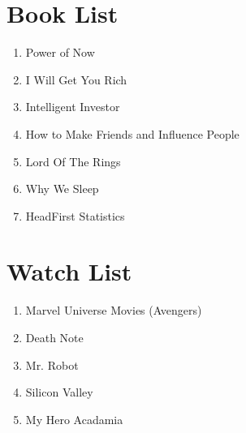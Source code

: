 \documentclass[10pt]{article}
\begin{document}
\section*{Book List}
\begin{enumerate}
    \item Power of Now
    \item I Will Get You Rich
    \item Intelligent Investor
    \item How to Make Friends and Influence People
    \item Lord Of The Rings
    \item Why We Sleep
    \item HeadFirst Statistics
\end{enumerate}

\section*{Watch List}
\begin{enumerate}
    \item Marvel Universe Movies (Avengers)
    \item Death Note
    \item Mr. Robot
    \item Silicon Valley
    \item My Hero Acadamia
\end{enumerate}
\end{document}
